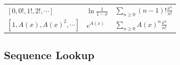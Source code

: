 \begin{longtable}[]{@{}lll@{}}
\begin{minipage}[t]{0.30\columnwidth}
\([0, 0!, 1!, 2!, \cdots ]\)\strut
\end{minipage} & \begin{minipage}[t]{0.30\columnwidth}\raggedright
\(\ln \frac{1}{1-x}\)\strut
\end{minipage} & \begin{minipage}[t]{0.30\columnwidth}\raggedright
\(\displaystyle\sum_{n \geq 0}(n-1)! \frac{x^n}{n!}\)\strut
\end{minipage}\tabularnewline
\begin{minipage}[t]{0.30\columnwidth}\raggedright
\([1, A(x), A(x)^2, \cdots ]\)\strut
\end{minipage} & \begin{minipage}[t]{0.30\columnwidth}\raggedright
\(e^{A(x)}\)\strut
\end{minipage} & \begin{minipage}[t]{0.30\columnwidth}\raggedright
\(\displaystyle\sum_{n\geq 0} A(x)^n \frac{x^n}{n!}\)\strut
\end{minipage}\tabularnewline
\bottomrule
\end{longtable}

\hypertarget{sequence-lookup}{%
\subsection{Sequence Lookup}\label{sequence-lookup}}

